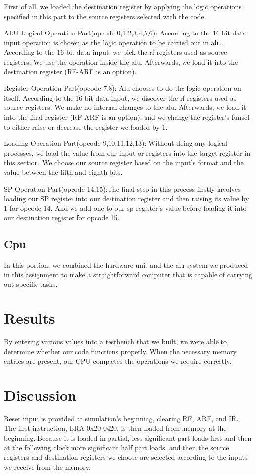 \documentclass[16pt]{article}
\begin{document}
First of all, we loaded the destination register by applying the logic operations specified in this part to the source registers selected with the code.

ALU Logical Operation Part(opcode 0,1,2,3,4,5,6): According to the 16-bit data input operation is chosen as the logic operation to be carried out in alu. According to the 16-bit data input, we pick the rf registers used as source registers. We use the operation inside the alu. Afterwards, we load it into the destination register (RF-ARF is an option).

Register Operation Part(opcode 7,8): Alu chooses to do the logic operation on itself. According to the 16-bit data input, we discover the rf registers used as source registers. We make no internal changes to the alu. Afterwards, we load it into the final register (RF-ARF is an option). and we change the register's funsel to either raise or decrease the register we loaded by 1.

Loading Operation Part(opcode 9,10,11,12,13): Without doing any logical processes, we load the value from our input or registers into the target register in this section. We choose our source register based on the input's format and the value between the fifth and eighth bits.

SP Operation Part(opcode 14,15):The final step in this process firstly involves loading our SP register into our destination register and then raising its value by 1 for opcode 14. And we add one to our sp register's value before loading it into our destination register for opcode 15.


\subsection{Cpu}
In this portion, we combined the hardware unit and the alu system we produced in this assignment to make a straightforward computer that is capable of carrying out specific tasks.
\section{Results}
By entering various values into a testbench that we built, we were able to determine whether our code functions properly. When the necessary memory entries are present, our CPU completes the operations we require correctly.
\section{Discussion}
Reset input is provided at simulation's beginning, clearing RF, ARF, and IR. The first instruction, BRA 0x20 0420, is then loaded from memory at the beginning. Because it is loaded in partial, less significant part loads first and then at the following clock more significant half part loads. and then the source registers and destination registers we choose are selected according to the inputs we receive from the memory.
\end{document}
